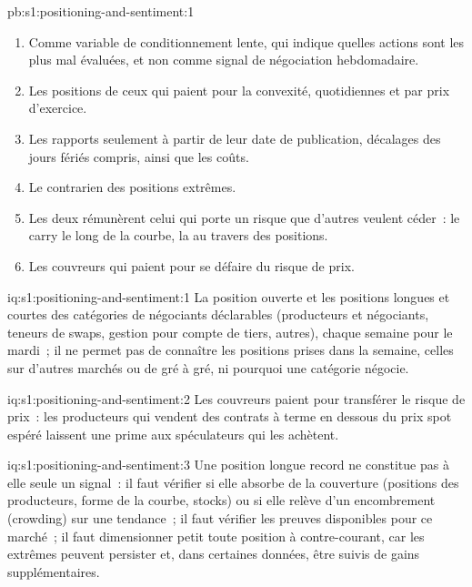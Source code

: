 \begin{solution}{pb:s1:positioning-and-sentiment:1}
\begin{enumerate}
\item Comme variable de conditionnement lente, qui indique quelles actions sont les plus mal évaluées, et non comme signal de négociation hebdomadaire.
\item Les positions de ceux qui paient pour la convexité, quotidiennes et par prix d'exercice.
\item Les rapports seulement à partir de leur date de publication, décalages des jours fériés compris, ainsi que les coûts.
\item Le contrarien des positions extrêmes.
\item Les deux rémunèrent celui qui porte un risque que d'autres veulent céder~: le carry le long de la courbe, la  au travers des positions.
\item Les couvreurs qui paient pour se défaire du risque de prix.
\end{enumerate}
\end{solution}

\begin{solution}{iq:s1:positioning-and-sentiment:1}
La position ouverte et les positions longues et courtes des catégories de négociants déclarables (producteurs et négociants, teneurs de swaps, gestion pour compte de tiers, autres), chaque semaine
pour le mardi~; il ne permet pas de connaître les positions prises dans la semaine, celles sur d'autres marchés ou de gré à gré, ni pourquoi une catégorie négocie.
\end{solution}

\begin{solution}{iq:s1:positioning-and-sentiment:2}
Les couvreurs paient pour transférer le risque de prix~: les producteurs qui vendent des contrats à terme en dessous du prix spot espéré laissent une prime aux spéculateurs qui les achètent.
\end{solution}

\begin{solution}{iq:s1:positioning-and-sentiment:3}
Une position longue record ne constitue pas à elle seule un signal~: il faut vérifier si elle absorbe de la couverture (positions des producteurs, forme de la courbe, stocks) ou si elle relève d'un encombrement (crowding) sur une tendance~;
il faut vérifier les preuves disponibles pour ce marché~; il faut dimensionner petit toute position à contre-courant, car les extrêmes peuvent persister et, dans certaines données, être suivis de gains supplémentaires.
\end{solution}


